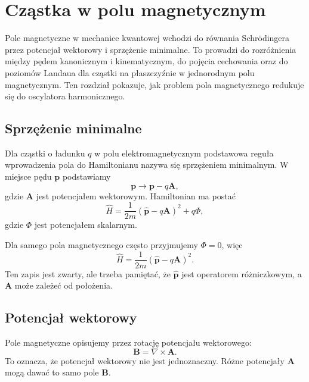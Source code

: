 \chapter{Cząstka w polu magnetycznym}

\begin{summarybox}
Pole magnetyczne w mechanice kwantowej wchodzi do równania Schrödingera przez
potencjał wektorowy i sprzężenie minimalne. To prowadzi do rozróżnienia między
pędem kanonicznym i kinematycznym, do pojęcia cechowania oraz do poziomów
Landaua dla cząstki na płaszczyźnie w jednorodnym polu magnetycznym. Ten rozdział
pokazuje, jak problem pola magnetycznego redukuje się do oscylatora harmonicznego.
\end{summarybox}

\section{Sprzężenie minimalne}

Dla cząstki o ładunku \(q\) w polu elektromagnetycznym podstawowa reguła wprowadzenia pola do Hamiltonianu nazywa się sprzężeniem minimalnym. W miejsce pędu \(\mathbf{p}\) podstawiamy
\begin{equation}
    \mathbf{p}\longrightarrow \mathbf{p}-q\mathbf{A},
\end{equation}
gdzie \(\mathbf{A}\) jest potencjałem wektorowym. Hamiltonian ma postać
\begin{equation}
    \hat{H}=\frac{1}{2m}\left(\hat{\mathbf{p}}-q\mathbf{A}\right)^2+q\Phi,
\end{equation}
gdzie \(\Phi\) jest potencjałem skalarnym.

Dla samego pola magnetycznego często przyjmujemy \(\Phi=0\), więc
\begin{equation}
    \hat{H}=\frac{1}{2m}\left(\hat{\mathbf{p}}-q\mathbf{A}\right)^2.
\end{equation}
Ten zapis jest zwarty, ale trzeba pamiętać, że \(\hat{\mathbf{p}}\) jest operatorem różniczkowym, a \(\mathbf{A}\) może zależeć od położenia.

\section{Potencjał wektorowy}

Pole magnetyczne opisujemy przez rotację potencjału wektorowego:
\begin{equation}
    \mathbf{B}=\nabla\times\mathbf{A}.
\end{equation}
To oznacza, że potencjał wektorowy nie jest jednoznaczny. Różne potencjały \(\mathbf{A}\) mogą dawać to samo pole \(\mathbf{B}\).

